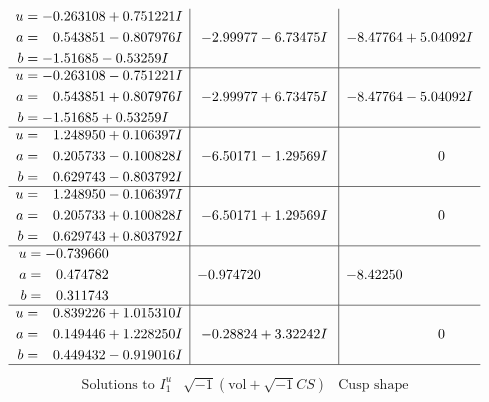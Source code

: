 \documentclass[1p]{elsarticle_modified}
\theoremstyle{definition}
\newcommand{\I}{\sqrt{-1}}
\begin{document}
$$\begin{array}{c|c|c}
\begin{aligned}
u &= -0.263108 + 0.751221 I \\
a &= \phantom{-}0.543851 - 0.807976 I \\
b &= -1.51685 - 0.53259 I\end{aligned}
 & -2.99977 - 6.73475 I & -8.47764 + 5.04092 I \\ \hline\begin{aligned}
u &= -0.263108 - 0.751221 I \\
a &= \phantom{-}0.543851 + 0.807976 I \\
b &= -1.51685 + 0.53259 I\end{aligned}
 & -2.99977 + 6.73475 I & -8.47764 - 5.04092 I \\ \hline\begin{aligned}
u &= \phantom{-}1.248950 + 0.106397 I \\
a &= \phantom{-}0.205733 - 0.100828 I \\
b &= \phantom{-}0.629743 - 0.803792 I\end{aligned}
 & -6.50171 - 1.29569 I & \phantom{-0.000000 } 0 \\ \hline\begin{aligned}
u &= \phantom{-}1.248950 - 0.106397 I \\
a &= \phantom{-}0.205733 + 0.100828 I \\
b &= \phantom{-}0.629743 + 0.803792 I\end{aligned}
 & -6.50171 + 1.29569 I & \phantom{-0.000000 } 0 \\ \hline\begin{aligned}
u &= -0.739660\phantom{ +0.000000I} \\
a &= \phantom{-}0.474782\phantom{ +0.000000I} \\
b &= \phantom{-}0.311743\phantom{ +0.000000I}\end{aligned}
 & -0.974720\phantom{ +0.000000I} & -8.42250\phantom{ +0.000000I} \\ \hline\begin{aligned}
u &= \phantom{-}0.839226 + 1.015310 I \\
a &= \phantom{-}0.149446 + 1.228250 I \\
b &= \phantom{-}0.449432 - 0.919016 I\end{aligned}
 & -0.28824 + 3.32242 I & \phantom{-0.000000 } 0\\
 \hline 
 \end{array}$$\newpage$$\begin{array}{c|c|c}  
\text{Solutions to }I^u_{1}& \I (\text{vol} + \sqrt{-1}CS) & \text{Cusp shape}\\

\end{array}$$
\end{document}
